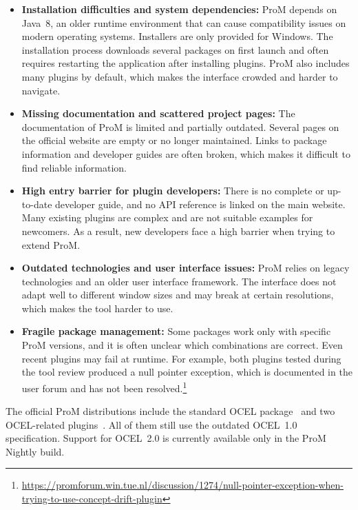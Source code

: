 \begin{itemize}
	\item \textbf{Installation difficulties and system dependencies:}
	      ProM depends on Java~8, an older runtime environment that can cause compatibility issues on modern operating systems.
	      Installers are only provided for Windows. The installation process downloads several packages on first launch and often requires restarting the application after installing plugins. ProM also includes many plugins by default, which makes the interface crowded and harder to navigate.

	\item \textbf{Missing documentation and scattered project pages:}
	      The documentation of ProM is limited and partially outdated. Several pages on the official website are empty or no longer maintained. Links to package information and developer guides are often broken, which makes it difficult to find reliable information.

	\item \textbf{High entry barrier for plugin developers:}
	      There is no complete or up-to-date developer guide, and no API reference is linked on the main website. Many existing plugins are complex and are not suitable examples for newcomers. As a result, new developers face a high barrier when trying to extend ProM.

	\item \textbf{Outdated technologies and user interface issues:}
	      ProM relies on legacy technologies and an older user interface framework. The interface does not adapt well to different window sizes and may break at certain resolutions, which makes the tool harder to use.
	\item \textbf{Fragile package management:}
	      Some packages work only with specific ProM versions, and it is often unclear which combinations are correct. Even recent plugins may fail at runtime.
	      For example, both plugins tested during the tool review produced a null pointer exception, which is documented in the user forum and has not been resolved.\footnote{\url{https://promforum.win.tue.nl/discussion/1274/null-pointer-exception-when-trying-to-use-concept-drift-plugin}}
\end{itemize}

The official ProM distributions include the standard OCEL package~\cite{ocel2} and two OCEL-related plugins~\cite{oclpm, constraintchecking}. All of them still use the outdated OCEL~1.0 specification. Support for OCEL~2.0 is currently available only in the ProM Nightly build.

